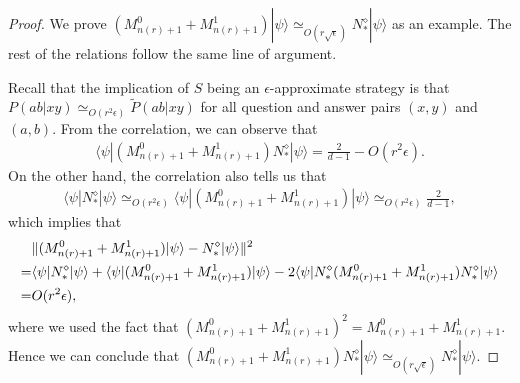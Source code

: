 \documentclass[11pt,letterpaper]{article}
\newcommand{\ket}[1]{|#1\rangle}
\newcommand{\bra}[1]{\langle#1|}
\DeclarePairedDelimiter{\norm}{\lVert}{\rVert}
\newcommand{\1}{\mathbb{1}}
\newcommand{\nr}{n(r)}
\newcommand{\pr}[2]{P(#1|#2)}
\newcommand{\tpr}[2]{\tilde{P}(#1|#2)}
\newcommand{\ep}{\epsilon}
\newcommand{\se}{\sqrt{\epsilon}}
\newcommand{\appd}[1]{\simeq_{#1}}
\theoremstyle{definition}
\begin{document}
\begin{proof} 
We prove $(M_{\nr+1}^0+M_{\nr+1}^1)\ket{\psi} \appd{O(r\se)} N_\ast^\diamond \ket{\psi}$ as an example.
The rest of the relations follow the same line of argument.

Recall that the implication of $S$ being an $\ep$-approximate strategy is that 
$\pr{ab}{xy} \appd{O(r^2\ep)} \tpr{ab}{xy}$ for all question and answer pairs $(x,y)$ and $(a,b)$.
From the correlation, we can observe that
\begin{align*}
 \bra{\psi} (M_{\nr+1}^0+M_{\nr+1}^1)N_\ast^\diamond \ket{\psi} = \frac{2}{d-1} - O(r^2 \epsilon).
\end{align*}
On the other hand, the correlation also tells us that 
\begin{align*}
	\bra{\psi} N_\ast^\diamond \ket{\psi} \appd{O(r^2\epsilon)} 
 \bra{\psi}(M_{\nr+1}^0+M_{\nr+1}^1)\ket{\psi} \appd{O(r^2\epsilon)} \frac{2}{d-1},
\end{align*}
which implies that 
\begin{align*}
	&\norm{(M_{\nr+1}^0 + M_{\nr+1}^1) \ket{\psi} - N_\ast^\diamond\ket{\psi}}^2 \\
	= &\bra{\psi} N_\ast^\diamond \ket{\psi}+\bra{\psi}(M_{\nr+1}^0+M_{\nr+1}^1)\ket{\psi} - 2\bra{\psi}N_\ast^\diamond(M_{\nr+1}^0 + M_{\nr+1}^1)N_\ast^\diamond \ket{\psi}\\
	= &O(r^2 \epsilon),
\end{align*}
where we used the fact that $(M_{\nr+1}^0 + M_{\nr+1}^1)^2 = M_{\nr+1}^0 + M_{\nr+1}^1$.
Hence we can conclude that $(M_{\nr+1}^0 + M_{\nr+1}^1)N_\ast^\diamond \ket{\psi} \appd{O(r\se)} N_\ast^\diamond\ket{\psi}$.
\end{proof}
\end{document}
